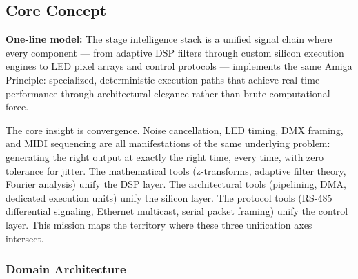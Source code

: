 \documentclass[11pt,letterpaper]{article}
\begin{document}
\subsection{Core Concept}

\begin{quotebox}
\textbf{One-line model:} The stage intelligence stack is a unified signal chain where every component --- from adaptive DSP filters through custom silicon execution engines to LED pixel arrays and control protocols --- implements the same Amiga Principle: specialized, deterministic execution paths that achieve real-time performance through architectural elegance rather than brute computational force.
\end{quotebox}

The core insight is convergence. Noise cancellation, LED timing, DMX framing, and MIDI sequencing are all manifestations of the same underlying problem: generating the right output at exactly the right time, every time, with zero tolerance for jitter. The mathematical tools (z-transforms, adaptive filter theory, Fourier analysis) unify the DSP layer. The architectural tools (pipelining, DMA, dedicated execution units) unify the silicon layer. The protocol tools (RS-485 differential signaling, Ethernet multicast, serial packet framing) unify the control layer. This mission maps the territory where these three unification axes intersect.

\subsubsection{Domain Architecture}
\end{document}

